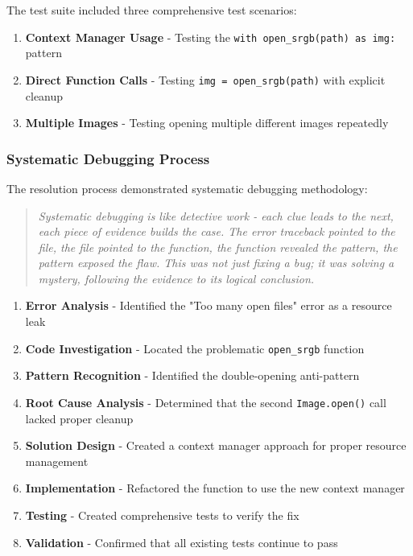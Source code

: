 \documentclass[11pt]{article}
\begin{document}
The test suite included three comprehensive test scenarios:

\begin{enumerate}
\item \textbf{Context Manager Usage} - Testing the \texttt{with open\_srgb(path) as img:} pattern
\item \textbf{Direct Function Calls} - Testing \texttt{img = open\_srgb(path)} with explicit cleanup
\item \textbf{Multiple Images} - Testing opening multiple different images repeatedly
\end{enumerate}

\subsubsection{Systematic Debugging Process}

The resolution process demonstrated systematic debugging methodology:

\begin{quote}
\emph{Systematic debugging is like detective work - each clue leads to the next, each piece of evidence builds the case. The error traceback pointed to the file, the file pointed to the function, the function revealed the pattern, the pattern exposed the flaw. This was not just fixing a bug; it was solving a mystery, following the evidence to its logical conclusion.}
\end{quote}

\begin{enumerate}
\item \textbf{Error Analysis} - Identified the "Too many open files" error as a resource leak
\item \textbf{Code Investigation} - Located the problematic \texttt{open\_srgb} function
\item \textbf{Pattern Recognition} - Identified the double-opening anti-pattern
\item \textbf{Root Cause Analysis} - Determined that the second \texttt{Image.open()} call lacked proper cleanup
\item \textbf{Solution Design} - Created a context manager approach for proper resource management
\item \textbf{Implementation} - Refactored the function to use the new context manager
\item \textbf{Testing} - Created comprehensive tests to verify the fix
\item \textbf{Validation} - Confirmed that all existing tests continue to pass
\end{enumerate}
\end{document}
